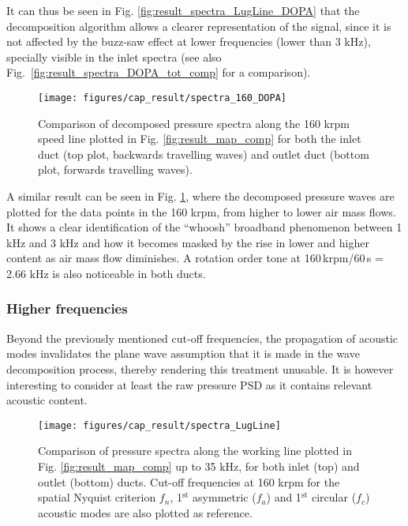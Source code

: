 It can thus be seen in Fig. \ref{fig:result_spectra_LugLine_DOPA} that the decomposition algorithm allows a clearer representation of the signal, since it is not affected by the buzz-saw effect at lower frequencies (lower than 3 kHz), specially visible in the inlet spectra (see also Fig.~\ref{fig:result_spectra_DOPA_tot_comp} for a comparison).

\begin{figure}[tbh!]
\centering
\texttt{[image: figures/cap\_result/spectra\_160\_DOPA]}
\caption{Comparison of decomposed pressure spectra along the 160 krpm speed line plotted in Fig. \ref{fig:result_map_comp} for both the inlet duct (top plot, backwards travelling waves) and outlet duct (bottom plot, forwards travelling waves).}
\label{fig:result_spectra_160_DOPA}
\end{figure}

A similar result can be seen in Fig. \ref{fig:result_spectra_160_DOPA}, where the decomposed pressure waves are plotted for the data points in the 160 krpm, from higher to lower air mass flows. It shows a clear identification of the ``whoosh'' broadband phenomenon between 1 kHz and 3 kHz and how it becomes masked by the rise in lower and higher content as air mass flow diminishes. A rotation order tone at 160\,krpm/60\,s = 2.66 kHz is also noticeable in both ducts.

\subsubsection{Higher frequencies}
\label{sub:result_high_freq}

Beyond the previously mentioned cut-off frequencies, the propagation of acoustic modes invalidates the plane wave assumption that it is made in the wave decomposition process, thereby rendering this treatment unusable. It is however interesting to consider at least the raw pressure PSD as it contains relevant acoustic content.

\begin{figure}[b!]
\centering
\texttt{[image: figures/cap\_result/spectra\_LugLine]}
\caption{Comparison of pressure spectra along the working line  plotted in Fig. \ref{fig:result_map_comp} up to 35 kHz, for both inlet (top) and outlet (bottom) ducts. Cut-off frequencies at 160 krpm for the spatial Nyquist criterion $f_n$, 1${}^\text{st}$ asymmetric ($f_a$) and 1${}^\text{st}$ circular ($f_c$) acoustic modes are also plotted as reference.}
\label{fig:result_spectra_LugLine}
\end{figure}


